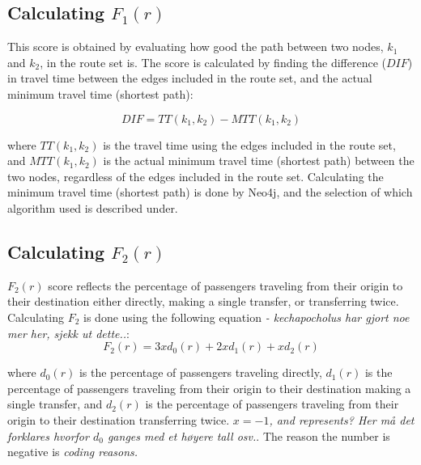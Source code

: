 \subsection{Calculating $F_{1}(r)$}

This score is obtained by evaluating how good the path between two nodes, $k_1$ and $k_2$, in the route set is. The score is calculated by finding the difference ($DIF$) in travel time between the edges included in the route set, and the actual minimum travel time (shortest path):

$$ DIF = TT(k_{1},k_{2}) - MTT(k_{1},k_{2})$$

where $ TT(k_{1},k_{2})$ is the travel time using the edges included in the route set, and $ MTT(k_{1},k_{2})$ is the actual minimum travel time (shortest path) between the two nodes, regardless of the edges included in the route set. Calculating the minimum travel time (shortest path) is done by Neo4j, and the selection of which algorithm used is described under.

\subsection{Calculating $F_{2}(r)$}
$F_{2}(r)$ score reflects the percentage of passengers traveling from their origin to their destination either directly, making a single transfer, or transferring twice. Calculating $F_{2}$ is done using the following equation \emph{\color{red} -  kechapocholus har gjort noe mer her, sjekk ut dette..}:
$$F_2(r) = 3xd_0(r)+ 2xd_1(r)+ xd_2(r) $$

where  $d_0(r)$ is the percentage of passengers traveling directly, $d_1(r)$ is the percentage of passengers traveling from their origin to their destination making a single transfer, and $d_2(r)$ is the percentage of passengers traveling from their origin to their destination transferring twice. \emph{\color{red}$x=-1$, and represents? Her må det forklares hvorfor $d_0$ ganges med et høyere tall osv.}. The reason the number is negative is \emph{\color{red}coding reasons. } 


